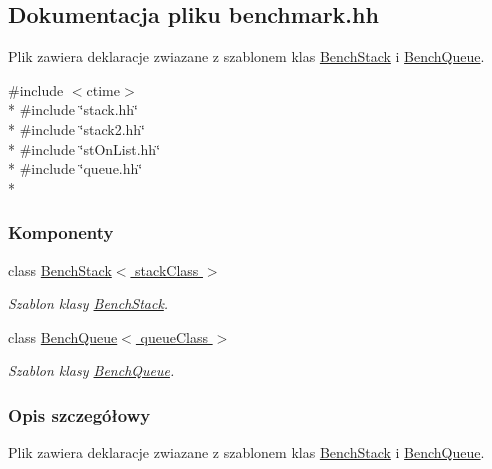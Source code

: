 \hypertarget{benchmark_8hh}{\subsection{Dokumentacja pliku benchmark.\-hh}
\label{benchmark_8hh}
}


Plik zawiera deklaracje zwiazane z szablonem klas \hyperlink{class_bench_stack}{Bench\-Stack} i \hyperlink{class_bench_queue}{Bench\-Queue}.  


{\ttfamily \#include $<$ctime$>$}\\*
{\ttfamily \#include \char`\"{}stack.\-hh\char`\"{}}\\*
{\ttfamily \#include \char`\"{}stack2.\-hh\char`\"{}}\\*
{\ttfamily \#include \char`\"{}st\-On\-List.\-hh\char`\"{}}\\*
{\ttfamily \#include \char`\"{}queue.\-hh\char`\"{}}\\*
\subsubsection*{Komponenty}
\begin{DoxyCompactItemize}
\item 
class \hyperlink{class_bench_stack}{Bench\-Stack$<$ stack\-Class $>$}
\begin{DoxyCompactList}\small\item\em Szablon klasy \hyperlink{class_bench_stack}{Bench\-Stack}. \end{DoxyCompactList}\item 
class \hyperlink{class_bench_queue}{Bench\-Queue$<$ queue\-Class $>$}
\begin{DoxyCompactList}\small\item\em Szablon klasy \hyperlink{class_bench_queue}{Bench\-Queue}. \end{DoxyCompactList}\end{DoxyCompactItemize}


\subsubsection{Opis szczegółowy}
Plik zawiera deklaracje zwiazane z szablonem klas \hyperlink{class_bench_stack}{Bench\-Stack} i \hyperlink{class_bench_queue}{Bench\-Queue}. 